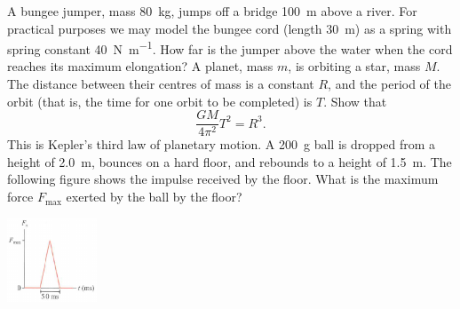\documentclass[a4paper]{exam}
\begin{document}
\begin{questions}
    \question A bungee jumper, mass \SI{80}{\kilo\gram}, jumps off a bridge \SI{100}{\metre} above a river. For practical purposes we may model
              the bungee cord (length \SI{30}{\metre}) as a spring with spring constant \SI{40}{\newton\per\metre}. How far is the jumper above
              the water when the cord reaches its maximum elongation?
    \question A planet, mass $ m $, is orbiting a star, mass $ M $. The distance between their centres of mass is a constant $ R $, and the period
              of the orbit (that is, the time for one orbit to be completed) is $ T $. Show that
              \begin{displaymath}
                \frac{GM}{4\pi^2} T^2 = R^3.
              \end{displaymath}
              This is Kepler's third law of planetary motion.
    \clearpage
    \question A \SI{200}{\gram} ball is dropped from a height of \SI{2.0}{\metre}, bounces on a hard floor, and rebounds to a height of \SI{1.5}{\metre}.
              The following figure shows the impulse received by the floor. What is the maximum force $ F_\text{max} $ exerted by the ball by the floor?

              \includegraphics[width=0.2\textwidth]{impulse_curve}
    \question
\end{questions}
\end{document}
